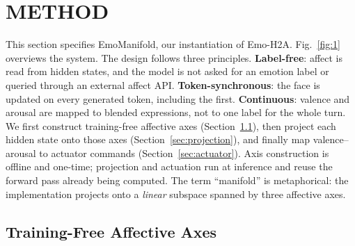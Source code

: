 \documentclass[letterpaper, 10 pt, conference]{ieeeconf/ieeeconf}
\begin{document}
\section{METHOD}
\label{sec:method}

This section specifies EmoManifold, our instantiation of Emo-H2A. Fig.~\ref{fig:1} overviews the system. The design follows three principles. \textbf{Label-free}: affect is read from hidden states, and the model is not asked for an emotion label or queried through an external affect API. \textbf{Token-synchronous}: the face is updated on every generated token, including the first. \textbf{Continuous}: valence and arousal are mapped to blended expressions, not to one label for the whole turn. We first construct training-free affective axes (Section~\ref{sec:axis_mining}), then project each hidden state onto those axes (Section~\ref{sec:projection}), and finally map valence--arousal to actuator commands (Section~\ref{sec:actuator}). Axis construction is offline and one-time; projection and actuation run at inference and reuse the forward pass already being computed. The term ``manifold'' is metaphorical: the implementation projects onto a \emph{linear} subspace spanned by three affective axes.

\subsection{Training-Free Affective Axes}
\label{sec:axis_mining}
\end{document}

